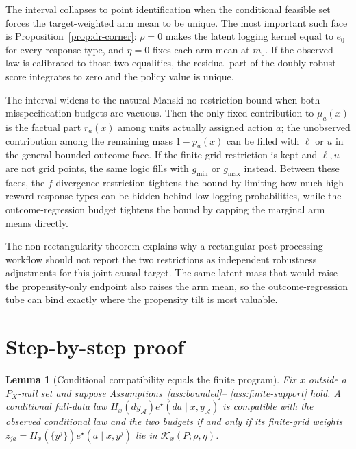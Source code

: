 \documentclass[11pt]{article}
\theoremstyle{definition}
\theoremstyle{plain}
\newtheorem{lemma}{Lemma}
\theoremstyle{remark}
\begin{document}
The interval collapses to point identification when the conditional feasible set
forces the target-weighted arm mean to be unique.  The most important such face
is Proposition~\ref{prop:dr-corner}: $\rho=0$ makes the latent logging kernel
equal to $e_0$ for every response type, and $\eta=0$ fixes each arm mean at
$m_0$.  If the observed law is calibrated to those two equalities, the residual
part of the doubly robust score integrates to zero and the policy value is
unique.

The interval widens to the natural Manski no-restriction bound when both
misspecification budgets are vacuous.  Then the only fixed contribution to
$\mu_a(x)$ is the factual part $r_a(x)$ among units actually assigned action
$a$; the unobserved contribution among the remaining mass $1-p_a(x)$ can be
filled with $\ell$ or $u$ in the general bounded-outcome face.  If the
finite-grid restriction is kept and $\ell,u$ are not grid points, the same
logic fills with $g_{\min}$ or $g_{\max}$ instead.  Between these faces, the
$f$-divergence restriction tightens the bound by limiting how much high-reward
response types can be hidden behind low logging probabilities, while the
outcome-regression budget tightens the bound by capping the marginal arm means
directly.

The non-rectangularity theorem explains why a rectangular post-processing
workflow should not report the two restrictions as independent robustness
adjustments for this joint causal target.  The same latent mass that would raise
the propensity-only endpoint also raises the arm mean, so the
outcome-regression tube can bind exactly where the propensity tilt is most
valuable.

\section{Step-by-step proof}
\begin{lemma}[Conditional compatibility equals the finite program]\label{lem:conditional-program}
Fix $x$ outside a $P_X$-null set and suppose Assumptions~\ref{ass:bounded}--
\ref{ass:finite-support} hold.  A conditional full-data law
$H_x(dy_{\mathcal A})e^\star(da\mid x,y_{\mathcal A})$ is compatible with the
observed conditional law and the two budgets if and only if its finite-grid
weights $z_{ja}=H_x(\{y^j\})e^\star(a\mid x,y^j)$ lie in
$\mathcal K_x(P;\rho,\eta)$.
\end{lemma}
\end{document}
